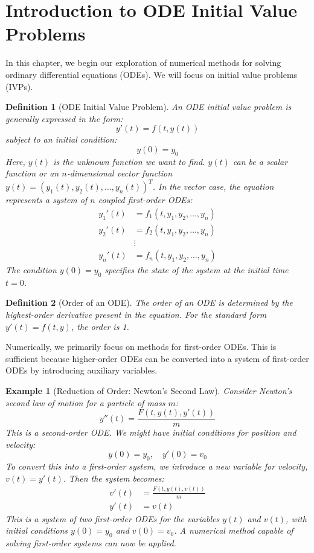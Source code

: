 \documentclass{article}
\newtheorem{definition}{Definition}
\newtheorem{example}{Example}
\begin{document}
\sloppy

\section{Introduction to ODE Initial Value Problems}

In this chapter, we begin our exploration of numerical methods for solving ordinary differential equations (ODEs). We will focus on initial value problems (IVPs).

\begin{definition}[ODE Initial Value Problem]
An ODE initial value problem is generally expressed in the form:
\[
y'(t) = f(t, y(t))
\]
subject to an initial condition:
\[
y(0) = y_0
\]
Here, $y(t)$ is the unknown function we want to find. $y(t)$ can be a scalar function or an $n$-dimensional vector function $y(t) = (y_1(t), y_2(t), \dots, y_n(t))^T$. In the vector case, the equation represents a system of $n$ coupled first-order ODEs:
\begin{align*}
y_1'(t) &= f_1(t, y_1, y_2, \dots, y_n) \\
y_2'(t) &= f_2(t, y_1, y_2, \dots, y_n) \\
&\vdots \\
y_n'(t) &= f_n(t, y_1, y_2, \dots, y_n)
\end{align*}
The condition $y(0) = y_0$ specifies the state of the system at the initial time $t=0$.
\end{definition}

\begin{definition}[Order of an ODE]
The order of an ODE is determined by the highest-order derivative present in the equation. For the standard form $y'(t) = f(t, y)$, the order is 1.
\end{definition}

Numerically, we primarily focus on methods for first-order ODEs. This is sufficient because higher-order ODEs can be converted into a system of first-order ODEs by introducing auxiliary variables.

\begin{example}[Reduction of Order: Newton's Second Law]
Consider Newton's second law of motion for a particle of mass $m$:
\[
y''(t) = \frac{F(t, y(t), y'(t))}{m}
\]
This is a second-order ODE. We might have initial conditions for position and velocity:
\[
y(0) = y_0, \quad y'(0) = v_0
\]
To convert this into a first-order system, we introduce a new variable for velocity, $v(t) = y'(t)$. Then the system becomes:
\begin{align*}
v'(t) &= \frac{F(t, y(t), v(t))}{m} \\
y'(t) &= v(t)
\end{align*}
This is a system of two first-order ODEs for the variables $y(t)$ and $v(t)$, with initial conditions $y(0) = y_0$ and $v(0) = v_0$. A numerical method capable of solving first-order systems can now be applied.
\end{example}
\end{document}
